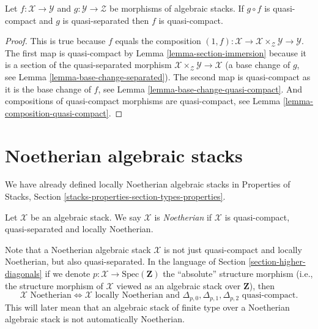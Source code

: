 \begin{lemma}
\label{lemma-quasi-compact-permanence}
Let $f : \mathcal{X} \to \mathcal{Y}$ and
$g : \mathcal{Y} \to \mathcal{Z}$ be morphisms of algebraic stacks.
If $g \circ f$ is quasi-compact and $g$ is quasi-separated
then $f$ is quasi-compact.
\end{lemma}

\begin{proof}
This is true because $f$ equals the composition
$(1, f) : \mathcal{X} \to \mathcal{X} \times_\mathcal{Z} \mathcal{Y} \to
\mathcal{Y}$.
The first map is quasi-compact by
Lemma \ref{lemma-section-immersion}
because it is a section of the quasi-separated morphism
$\mathcal{X} \times_\mathcal{Z} \mathcal{Y} \to \mathcal{X}$
(a base change of $g$, see
Lemma \ref{lemma-base-change-separated}).
The second map is quasi-compact as it is the base change of $f$, see
Lemma \ref{lemma-base-change-quasi-compact}.
And compositions of quasi-compact
morphisms are quasi-compact, see Lemma \ref{lemma-composition-quasi-compact}.
\end{proof}









\section{Noetherian algebraic stacks}
\label{section-noetherian}

\noindent
We have already defined locally Noetherian algebraic stacks in
Properties of Stacks, Section \ref{stacks-properties-section-types-properties}.

\begin{definition}
\label{definition-noetherian}
Let $\mathcal{X}$ be an algebraic stack. We say $\mathcal{X}$ is
{\it Noetherian} if $\mathcal{X}$ is quasi-compact, quasi-separated
and locally Noetherian.
\end{definition}

\noindent
Note that a Noetherian algebraic stack $\mathcal{X}$ is not just quasi-compact
and locally Noetherian, but also quasi-separated. In the language of
Section \ref{section-higher-diagonals}
if we denote $p : \mathcal{X} \to \text{Spec}(\mathbf{Z})$ the
``absolute'' structure morphism (i.e., the structure morphism of
$\mathcal{X}$ viewed as an algebraic stack over $\mathbf{Z}$), then
$$
\mathcal{X}\text{ Noetherian}
\Leftrightarrow
\mathcal{X}\text{ locally Noetherian and }
\Delta_{p, 0}, \Delta_{p, 1}, \Delta_{p, 2}
\text{ quasi-compact}.
$$
This will later mean that an algebraic stack of finite type over a
Noetherian algebraic stack is not automatically Noetherian.








